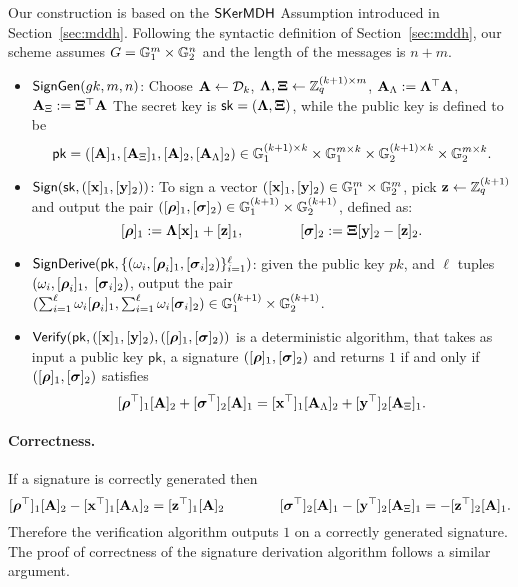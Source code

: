 Our construction is based on the $\mathsf{SKerMDH}$ Assumption introduced in Section~\ref{sec:mddh}. Following the syntactic definition of Section~\ref{sec:mddh},
our scheme assumes $G = \mathbb{G}_1^m\times\mathbb{G}_2^n$ and the length of the messages is $n+m$.
 
\begin{itemize}
\item $\mathsf{SignGen}(gk,m,n)$:
Choose $\mathbf{{A}} \leftarrow \mathcal{D}_{k}$,
$\mathbf{{\Lambda}},\mathbf{{\Xi}} \leftarrow \mathbb{Z}_q^{(k+1) \times m}$, $\mathbf{A}_{\Lambda}:=\mathbf{{\Lambda}}^\top \mathbf{{A}}$, 
$\mathbf{A}_{\Xi}:=\mathbf{{\Xi}}^\top \mathbf{{A}}$
The secret key is $\mathsf{sk}=(\mathbf{{\Lambda}},\mathbf{{\Xi}})$, while the public key is defined to be
$$\mathsf{pk}=([\mathbf{A}]_1, [\mathbf{A}_{\Xi}]_1,[\mathbf{A}]_2, [\mathbf{A}_{\Lambda}]_2) \in  \mathbb{G}_1^{(k+1) \times k} \times \mathbb{G}_1^{m \times k} \times \mathbb{G}_2^{(k+1) \times k} \times \mathbb{G}_2^{m \times k}.$$
\item $\mathsf{Sign}(\mathsf{sk},([\mathbf{x}]_1,[\mathbf{y}]_2))$: To sign a vector $([\mathbf{x}]_1,[\mathbf{y}]_2) \in \mathbb{G}_1^{m} \times \mathbb{G}_2^{m}$, pick 
$\mathbf{z} \leftarrow \mathbb{Z}_q^{(k+1)}$ and output the pair 
$([{\boldsymbol \rho}]_1, [{\boldsymbol \sigma}]_2) \in \mathbb{G}_1^{(k+1)} \times \mathbb{G}_2^{(k+1)}$, defined as:
$$[{\boldsymbol \rho}]_1:=   \mathbf{{\Lambda}}[\mathbf{x}]_1 + [\mathbf{z}]_1,
                            \qquad \qquad 
[{\boldsymbol \sigma}]_2 := \mathbf{{\Xi}}[\mathbf{y}]_2 - [\mathbf{z}]_2.$$   
 \item  $\mathsf{SignDerive}(\mathsf{pk},\{(\omega_i,[{\boldsymbol \rho}_i]_1, [{\boldsymbol \sigma}_i]_2)\}_{i=1}^{\ell})$: given the public key $pk$, and $\ell$ tuples 
 $(\omega_i,[{\boldsymbol \rho}_i]_1,$ $[{\boldsymbol \sigma}_i]_2)$, output the pair 
 $(\sum_{i=1}^{\ell} \omega_i [{\boldsymbol \rho}_i]_1, \sum_{i=1}^{\ell} \omega_i  [{\boldsymbol \sigma}_i]_2) \in \mathbb{G}_1^{(k+1)} \times \mathbb{G}_2^{(k+1)}$. 
 \item $\mathsf{Verify}(\mathsf{pk},([\mathbf{x}]_1,[\mathbf{y}]_2), ([{\boldsymbol \rho}]_1, [{\boldsymbol \sigma}]_2))$  is a deterministic algorithm, that takes as input a public key $\mathsf{pk}$,  a signature $([{\boldsymbol \rho}]_1, [{\boldsymbol \sigma}]_2)$ and returns $1$ if and only if 
$([{\boldsymbol \rho}]_1, [{\boldsymbol \sigma}]_2)$ satisfies
$$ [{\boldsymbol \rho}^{\top}]_1 [\mathbf{A}]_2+ [{\boldsymbol \sigma}^{\top}]_2 [\mathbf{A}]_1= [\mathbf{x}^{\top}]_1 [\mathbf{A}_{\Lambda}]_2+[\mathbf{y}^{\top}]_2[\mathbf{A}_{\Xi}]_1. $$
\end{itemize}

\paragraph{Correctness.} If a signature is correctly generated then 
$$[{\boldsymbol \rho}^{\top}]_1 [\mathbf{{A}}]_2-[\mathbf{x}^{\top}]_1 [\mathbf{{A}}_{\Lambda}]_2= [\mathbf{z}^{\top}]_1 [\mathbf{{A}}]_2 \qquad \qquad  [{\boldsymbol \sigma}^{\top}]_2[\mathbf{{A}}]_1 -[\mathbf{y}^{\top}]_2  [\mathbf{{A}}_{\Xi}]_1= -[\mathbf{z}^{\top}]_2 [\mathbf{{A}}]_1.$$
Therefore the verification algorithm outputs $1$ on a correctly generated signature. The proof of correctness  of the signature derivation algorithm follows a similar argument.  

